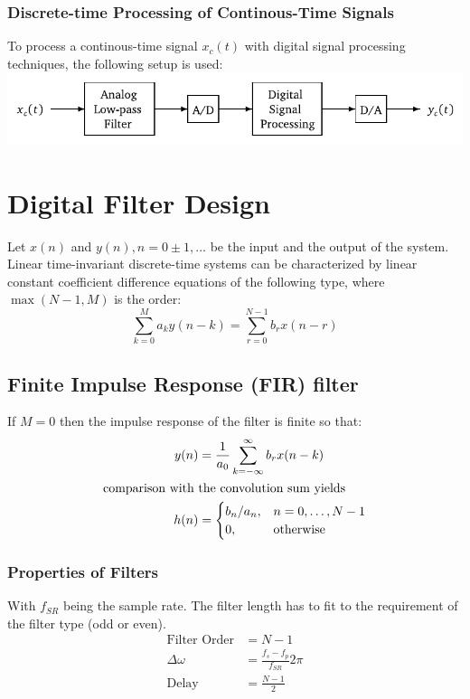 \documentclass[accentcolor=tud4c,9.5pt,nochapname,bigchapter,paper=a5report]{tudreport}
\begin{document}
\subsection{Discrete-time Processing of Continous-Time Signals}
To process a continous-time signal $x_c(t)$ with digital signal processing techniques, the following setup is used:\\
\includegraphics[width=\textwidth]{figures/dsp_setup.pdf}

\chapter{Digital Filter Design}

Let $x(n)$ and $y(n) , n=0\pm 1,\ldots$ be the input and the output of the system.  
Linear time-invariant discrete-time systems can be characterized 
 by linear constant coefficient difference equations of the following type, where $\max(N-1,M)$ is the order:
 \begin {equation}
 \sum\limits_{k=0}^{M}a_ky(n-k)= \sum\limits_{r=0}^{N-1} b_r x(n-r)
 \end{equation}
\section{Finite Impulse Response (FIR) filter}
If $M=0$ then the impulse response of the filter is finite so that:
\begin{subequations}
\begin{align}
y(n) &= \frac{1}{a_0}\sum\limits_{k=-\infty}^{\infty}b_r x(n-k) \\
\text{comparison with } &\text{the convolution sum yields} \notag \\
h(n) &= \begin{cases}
b_n/a_n, &n=0,\ldots,N-1\\
0, &\text{otherwise}
\end{cases}
\end{align}
\end{subequations}
\subsection{Properties of Filters}
With $f_{SR}$ being the sample rate.
The filter length has to fit to the requirement of the filter type (odd or even).
\begin{align}
\text{Filter Order}&=N-1 \\
\Delta\omega &= \frac{f_s-f_p}{f_{SR}} 2\pi\\
\text{Delay} &=\frac{N-1}{2}
\end{align}
\end{document}
